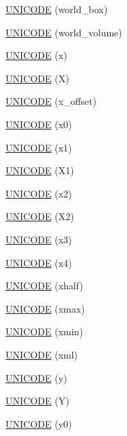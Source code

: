 \begin{DoxyCompactItemize}
\item 
\hyperlink{namespace_d_d4hep_1_1_x_m_l_a1058f369b75341da0d644e9548dcfa30}{UNICODE} (world\_\-box)
\item 
\hyperlink{namespace_d_d4hep_1_1_x_m_l_a22a545538ae3b5ec429edc6def4b4a30}{UNICODE} (world\_\-volume)
\item 
\hyperlink{namespace_d_d4hep_1_1_x_m_l_aa81f798502a97a2f58baf12aad7892d0}{UNICODE} (x)
\item 
\hyperlink{namespace_d_d4hep_1_1_x_m_l_a300572f08741250a889bb63a49dc2fe8}{UNICODE} (X)
\item 
\hyperlink{namespace_d_d4hep_1_1_x_m_l_a10fd1c3466ee3bf3990e323bb2c64020}{UNICODE} (x\_\-offset)
\item 
\hyperlink{namespace_d_d4hep_1_1_x_m_l_a5c206f909ef697ef9ec33d6c22cbb42a}{UNICODE} (x0)
\item 
\hyperlink{namespace_d_d4hep_1_1_x_m_l_a582f7ee51ef7963c53f9c41b9c72d34e}{UNICODE} (x1)
\item 
\hyperlink{namespace_d_d4hep_1_1_x_m_l_ab40f3cd1131835e0190023968994fe9a}{UNICODE} (X1)
\item 
\hyperlink{namespace_d_d4hep_1_1_x_m_l_aed16280b8ea3df76804a15091b175996}{UNICODE} (x2)
\item 
\hyperlink{namespace_d_d4hep_1_1_x_m_l_ab6031a4a941bb035c4b7bd941199d11e}{UNICODE} (X2)
\item 
\hyperlink{namespace_d_d4hep_1_1_x_m_l_ac26d6538c97cfdff2f21eef53e63f626}{UNICODE} (x3)
\item 
\hyperlink{namespace_d_d4hep_1_1_x_m_l_ac70d5fbabbb1dad5bfeb7023fe4443ca}{UNICODE} (x4)
\item 
\hyperlink{namespace_d_d4hep_1_1_x_m_l_ac33bf9b2838e026b46558a5e0d47cf56}{UNICODE} (xhalf)
\item 
\hyperlink{namespace_d_d4hep_1_1_x_m_l_abc79b9b348bdcf3d20f2d28dc9e92060}{UNICODE} (xmax)
\item 
\hyperlink{namespace_d_d4hep_1_1_x_m_l_a52f4714500b5b765085d987cd841f1af}{UNICODE} (xmin)
\item 
\hyperlink{namespace_d_d4hep_1_1_x_m_l_a8c9167dc0a99496e7e96cab05a0835ac}{UNICODE} (xml)
\item 
\hyperlink{namespace_d_d4hep_1_1_x_m_l_a9d5557416f742b3fe86d1031cd0dcb62}{UNICODE} (y)
\item 
\hyperlink{namespace_d_d4hep_1_1_x_m_l_a03c46f62750a86a4cc38f11083a31d69}{UNICODE} (Y)
\item 
\hyperlink{namespace_d_d4hep_1_1_x_m_l_aebab4301ae38f1057dca239e1e5bfc81}{UNICODE} (y0)

\end{DoxyCompactItemize}
